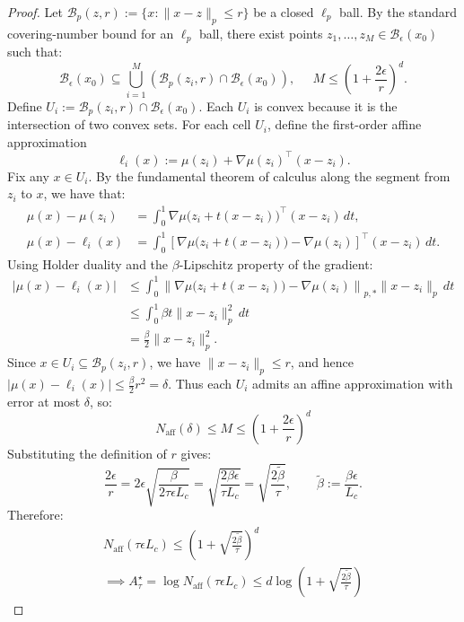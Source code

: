 \documentclass{article}
\theoremstyle{definition}
\begin{document}
\begin{proof}
Let $\mathcal{B}_p(z,r):=\{x:\|x-z\|_p\leq r\}$ be a closed $\ell_p$ ball. By the standard covering-number bound for an $\ell_p$ ball, there exist points $z_1,\dots,z_M\in\mathcal{B}_\epsilon(x_0)$ such that:
\begin{equation}
    \mathcal{B}_\epsilon(x_0)
    \subseteq
    \bigcup_{i=1}^M
    \left(
        \mathcal{B}_p(z_i,r)\cap \mathcal{B}_\epsilon(x_0)
    \right),
    \;\;\;\;\;
    M\leq\left(1+\frac{2\epsilon}{r}\right)^d .
\end{equation}
Define $U_i:=\mathcal{B}_p(z_i,r)\cap \mathcal{B}_\epsilon(x_0)$. Each $U_i$ is convex because it is the intersection of two convex sets. For each cell $U_i$, define the first-order affine approximation
\begin{equation}
    \ell_i(x):=\mu(z_i)+\nabla\mu(z_i)^\top(x-z_i).
\end{equation}
Fix any $x\in U_i$. By the fundamental theorem of calculus along the segment from $z_i$ to $x$, we have that:
\begin{align}
    \mu(x)-\mu(z_i) &= \int_0^1 \nabla\mu\bigl(z_i+t(x-z_i)\bigr)^\top (x-z_i)
    \,dt, \\
    \mu(x)-\ell_i(x) &= \int_0^1\left[
        \nabla\mu\bigl(z_i+t(x-z_i)\bigr)
        -
        \nabla\mu(z_i)\right]^\top(x-z_i)\,dt .
\end{align}
Using Holder duality and the $\beta$-Lipschitz property of the gradient:
\begin{align}
    |\mu(x)-\ell_i(x)| &\leq \int_0^1 \left\|
        \nabla\mu\bigl(z_i+t(x-z_i)\bigr) - \nabla\mu(z_i) \right\|_{p,*} \|x-z_i\|_p\,dt \\
    &\leq\int_0^1\beta t\|x-z_i\|_p^2\,dt \\
    &=\frac{\beta}{2}\|x-z_i\|_p^2 .
\end{align}
Since $x\in U_i\subseteq \mathcal{B}_p(z_i,r)$, we have $\|x-z_i\|_p\leq r$, and hence
$|\mu(x)-\ell_i(x)|\leq \frac{\beta}{2}r^2=\delta$. Thus each $U_i$ admits an affine approximation with error at most $\delta$, so:
\begin{equation}
    N_{\mathrm{aff}}(\delta)
    \leq
    M
    \leq
    \left(
        1+\frac{2\epsilon}{r}
    \right)^d
\end{equation}
Substituting the definition of $r$ gives:
\begin{equation}
    \frac{2\epsilon}{r}
    = 2\epsilon \sqrt{\frac{\beta}{2\tau\epsilon L_c}}
    =\sqrt{\frac{2\beta\epsilon}{\tau L_c}}
    = \sqrt{\frac{2\widetilde\beta}{\tau}},\qquad
    \widetilde\beta:=\frac{\beta\epsilon}{L_c}.
\end{equation}
Therefore:
\begin{align}
    N_{\mathrm{aff}}(\tau\epsilon L_c)
    \leq
    \left(
        1+\sqrt{\frac{2\widetilde\beta}{\tau}}
    \right)^d \\
    \implies A_\tau^\star
     =
    \log N_{\mathrm{aff}}(\tau\epsilon L_c)\leq d\log
    \left(
        1+\sqrt{\frac{2\widetilde\beta}{\tau}}
    \right)
\end{align}
\end{proof}
\end{document}
